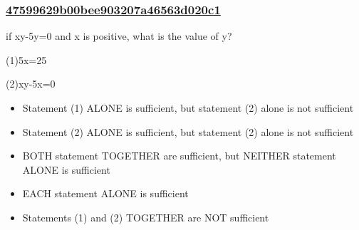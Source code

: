 \documentclass[]{beamer}
\begin{document}
\begin{frame}
    \frametitle{\underline{47599629b00bee903207a46563d020c1}}
    if xy-5y=0 and x is positive, what is the value of y?\par
(1)5x=25\par
(2)xy-5x=0
    
    \begin{itemize}
        \item
            Statement (1) ALONE is sufficient, but statement (2) alone is not sufficient
        \item
            Statement (2) ALONE is sufficient, but statement (2) alone is not sufficient
        \item
            BOTH statement TOGETHER are sufficient, but NEITHER statement ALONE is sufficient
        \item
            EACH statement ALONE is sufficient
        \item
            Statements (1) and (2) TOGETHER are NOT sufficient
    \end{itemize}
\end{frame}
\end{document}
